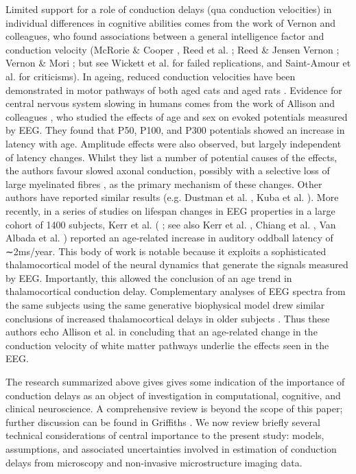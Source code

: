 Limited support for a role of conduction delays (qua conduction velocities) in individual differences in cognitive abilities comes from the work of Vernon and colleagues, who found associations between a general intelligence factor and conduction velocity (McRorie \& Cooper  , Reed et al. ; Reed \& Jensen 
Vernon ; Vernon \& Mori  ; but see Wickett et al.  for failed replications, and Saint-Amour et al.  for criticisms). In ageing, reduced conduction velocities have been demonstrated in motor pathways of both aged cats  and aged rats . Evidence for central nervous system slowing in humans comes from the work of Allison and colleagues , who studied the effects of age and sex on evoked potentials measured by EEG. They found that P50, P100, and P300 potentials showed an increase in latency with age.  Amplitude effects were also observed, but largely independent of latency changes. Whilst they list a number of potential causes of the effects, the authors favour slowed axonal conduction, possibly with a selective loss of large myelinated fibres , as the primary mechanism of these changes. Other authors have reported similar results (e.g. Dustman et al. , Kuba et al. ). More recently, in a series of studies on lifespan changes in EEG properties in a large cohort of 1400 subjects, Kerr et al. ( 
; see also Kerr et al. , Chiang et al. , Van Albada et al. ) reported an age-related increase in auditory oddball latency of ∼2ms/year. This body of work is notable because it exploits a sophisticated thalamocortical model of the neural dynamics that generate the signals measured by EEG. Importantly, this allowed the conclusion of an age trend in thalamocortical conduction delay. Complementary analyses of EEG spectra from the same subjects using the same generative biophysical model drew similar conclusions of increased thalamocortical delays in older subjects . Thus these authors echo Allison et al.  \citeyear{allison1984developmental} in concluding that an age-related change in the conduction velocity of white matter pathways underlie the effects seen in the EEG. 

The research summarized above gives gives some indication of the importance of conduction delays as an object of investigation in computational, cognitive, and clinical neuroscience. A comprehensive review is beyond the scope of this paper; further discussion can be found in Griffiths \citeyear{griffiths2014the}. We now review briefly several technical considerations of central importance to the present study: models, assumptions, and associated uncertainties involved in estimation of conduction delays from microscopy and non-invasive microstructure imaging data. 


